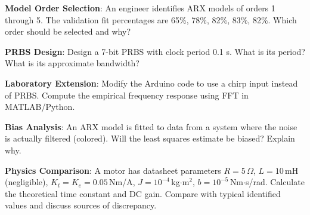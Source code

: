 \begin{exercise}
\textbf{Model Order Selection}: An engineer identifies ARX models of orders 1 through 5. The validation fit percentages are 65\%, 78\%, 82\%, 83\%, 82\%. Which order should be selected and why?
\end{exercise}

\begin{exercise}
\textbf{PRBS Design}: Design a 7-bit PRBS with clock period 0.1 s. What is its period? What is its approximate bandwidth?
\end{exercise}

\begin{exercise}
\textbf{Laboratory Extension}: Modify the Arduino code to use a chirp input instead of PRBS. Compute the empirical frequency response using FFT in MATLAB/Python.
\end{exercise}

\begin{exercise}
\textbf{Bias Analysis}: An ARX model is fitted to data from a system where the noise is actually filtered (colored). Will the least squares estimate be biased? Explain why.
\end{exercise}

\begin{exercise}
\textbf{Physics Comparison}: A motor has datasheet parameters $R = 5\,\Omega$, $L = 10\,$mH (negligible), $K_t = K_e = 0.05\,$Nm/A, $J = 10^{-4}\,$kg$\cdot$m$^2$, $b = 10^{-5}\,$Nm$\cdot$s/rad. Calculate the theoretical time constant and DC gain. Compare with typical identified values and discuss sources of discrepancy.
\end{exercise}

